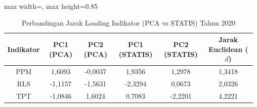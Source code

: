 \begin{table}[H]
\centering
\caption{Perbandingan Jarak Loading Indikator (PCA vs STATIS) Tahun 2020} \label{tab:sample1jarak_loading_2020}
\begin{adjustbox}{max width=\textwidth, max height=0.85\textheight}
\begin{tabular}{|c|c|c|c|c|c|}
\hline
\textbf{Indikator} & \textbf{PC1 (PCA)} & \textbf{PC2 (PCA)} & \textbf{PC1 (STATIS)} & \textbf{PC2 (STATIS)} & \textbf{Jarak Euclidean ($d$)} \\
\hline
PPM & 1,6093 & -0,0037 & 1,9356 & 1,2978 & 1,3418 \\
RLS & -1,1157 & -1,5631 & -2,3294 & 0,0673 & 2,0326 \\
TPT & -1,0846 & 1,6024 & 0,7083 & -2,2201 & 4,2221 \\
\hline
\end{tabular}
\end{adjustbox}
\end{table}
